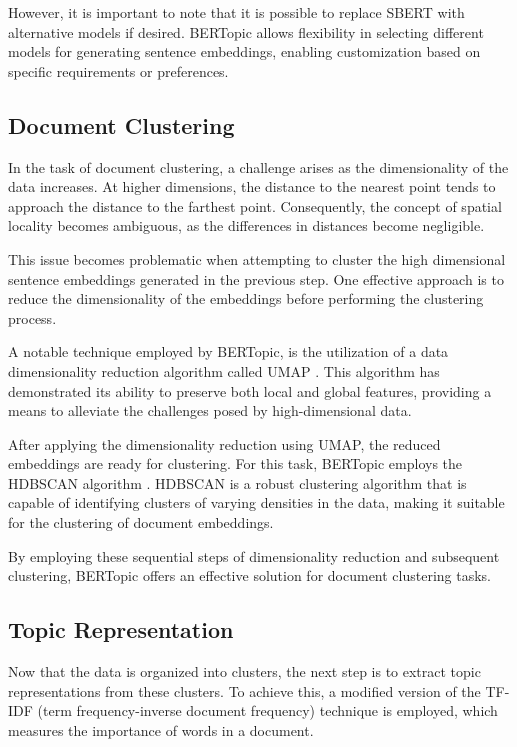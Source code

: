 \documentclass[a4paper,10pt]{report} %
\begin{document}
However, it is important to note that it is possible to replace SBERT with alternative models if desired. BERTopic allows flexibility in selecting different models for generating sentence embeddings, enabling customization based on specific requirements or preferences. \cite{bertopic}

\subsection{Document Clustering}
In the task of document clustering, a challenge arises as the dimensionality of the data increases. At higher dimensions, the distance to the nearest point tends to approach the distance to the farthest point. Consequently, the concept of spatial locality becomes ambiguous, as the differences in distances become negligible.

This issue becomes problematic when attempting to cluster the high dimensional sentence embeddings generated in the previous step. One effective approach is to reduce the dimensionality of the embeddings before performing the clustering process.

A notable technique employed by BERTopic, is the utilization of a data dimensionality reduction algorithm called UMAP \cite{umap}. This algorithm has demonstrated its ability to preserve both local and global features, providing a means to alleviate the challenges posed by high-dimensional data.

After applying the dimensionality reduction using UMAP, the reduced embeddings are ready for clustering. For this task, BERTopic employs the HDBSCAN algorithm \cite{hdbscan}. HDBSCAN is a robust clustering algorithm that is capable of identifying clusters of varying densities in the data, making it suitable for the clustering of document embeddings.

By employing these sequential steps of dimensionality reduction and subsequent clustering, BERTopic offers an effective solution for document clustering tasks. \cite{bertopic}

\subsection{Topic Representation}
Now that the data is organized into clusters, the next step is to extract topic representations from these clusters. To achieve this, a modified version of the TF-IDF (term frequency-inverse document frequency) technique is employed, which measures the importance of words in a document.
\end{document}
